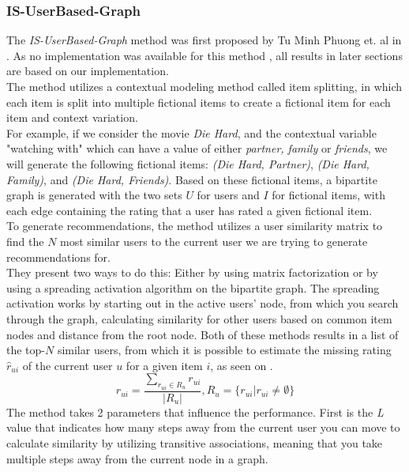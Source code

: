 \subsubsection{IS-UserBased-Graph}\label{method:IS-UserBased-Graph}
The \textit{IS-UserBased-Graph} method was first proposed by Tu Minh Phuong et. al in \cite{GraphBasedCollaborativePaper}.
As no implementation was available for this method , all results in later sections are based on our implementation.\\
The method utilizes a contextual modeling method called item splitting, in which each item is split into multiple fictional items to create a fictional item for each item and context variation.
\\
For example, if we consider the movie \textit{Die Hard}, and the contextual variable "watching with" which can have a value of either \textit{partner, family} or \textit{friends}, we will generate the following fictional items: \textit{(Die Hard, Partner)}, \textit{(Die Hard, Family)}, and \textit{(Die Hard, Friends)}.
Based on these fictional items, a bipartite graph is generated with the two sets $U$ for users and $I$ for fictional items, with each edge containing the rating that a user has rated a given fictional item.\\
To generate recommendations, the method utilizes a user similarity matrix to find the $N$ most similar users to the current user we are trying to generate recommendations for.\\
They present two ways to do this: Either by using matrix factorization or by using a spreading activation algorithm on the bipartite graph.
The spreading activation works by starting out in the active users' node, from which you search through the graph, calculating similarity for other users based on common item nodes and distance from the root node.
Both of these methods results in a list of the top-$N$ similar users, from which it is possible to estimate the missing rating $\hat{r}_{ui}$ of the current user $u$ for a given item $i$, as seen on .
\begin{equation}
    \label{eqn:israj}
    \hat{r}_{ui} = \frac{\sum_{r_{ui} \in R_u} r_{ui}}{|R_u|}, R_u = \{ r_{ui} | r_{ui} \neq \emptyset\}
\end{equation}
The method takes 2 parameters that influence the performance.
First is the \textit{L} value that indicates how many steps away from the current user you can move to calculate similarity by utilizing transitive associations, meaning that you take multiple steps away from the current node in a graph.
